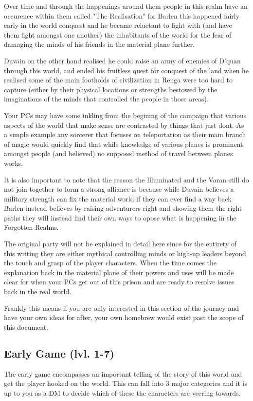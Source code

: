 \documentclass[10pt,twoside,twocolumn]{article}
\begin{document}
Over time and through the happenings around them people in this realm have an occurence within them called "The Realisation" for Barlen this happened fairly early in the world conquest and he became reluctant to fight with (and have them fight amongst one another) the inhabitants of the world for the fear of damaging the minds of his friends in the material plane further.

Duvain on the other hand realised he could raise an army of enemies of D'quan through this world, and ended his fruitless quest for conquest of the land when he realised some of the main footholds of civilization in Renga were too hard to capture (either by their physical locations or strengths bestowed by the imaginations of the minds that controlled the people in those areas).

Your PCs may have some inkling from the begining of the campaign that various aspects of the world that make sense are contrasted by things that just dont. As a simple example any sorcerer that focuses on teleportation as their main branch of magic would quickly find that while knowledge of various planes is prominent amongst people (and believed) no supposed method of travel between planes works.

It is also important to note that the reason the Illuminated and the Varan still do not join together to form a strong alliance is because while Duvain believes a military strength can fix the material world if they can ever find a way back Barlen instead believes by raising adventurers right and showing them the right paths they will instead find their own ways to opose what is happening in the Forgotten Realms.

The original party will not be explained in detail here since for the entirety of this writing they are either mythical controlling minds or high-up leaders beyond the touch and grasp of the player characters. When the time comes the explanation back in the material plane of their powers and uses will be made clear for when your PCs get out of this prison and are ready to resolve issues back in the real world.

Frankly this means if you are only interested in this section of the journey and have your own ideas for after, your own homebrew would exist past the scope of this document.

\subsection{Early Game (lvl. 1-7)}
The early game encompasses an important telling of the story of this world and get the player hooked on the world. This can fall into 3 major categories and it is up to you as a DM to decide which of these the characters are veering towards.
\end{document}
